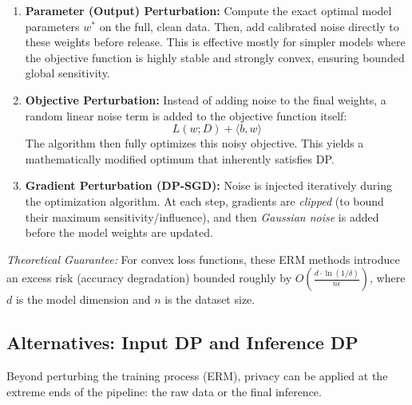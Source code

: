 \documentclass[11pt, a4paper]{article}
\begin{document}
\begin{enumerate}
    \item \textbf{Parameter (Output) Perturbation:}
    Compute the exact optimal model parameters $w^*$ on the full, clean data. Then, add calibrated noise directly to these weights before release. This is effective mostly for simpler models where the objective function is highly stable and strongly convex, ensuring bounded global sensitivity.
    
    \item \textbf{Objective Perturbation:}
    Instead of adding noise to the final weights, a random linear noise term is added to the objective function itself: 
    \[ L(w;D) + \langle b, w \rangle \]
    The algorithm then fully optimizes this noisy objective. This yields a mathematically modified optimum that inherently satisfies DP.
    
    \item \textbf{Gradient Perturbation (DP-SGD):}
    Noise is injected iteratively during the optimization algorithm. At each step, gradients are \textit{clipped} (to bound their maximum sensitivity/influence), and then \textit{Gaussian noise} is added before the model weights are updated.
\end{enumerate}

\textit{Theoretical Guarantee:} For convex loss functions, these ERM methods introduce an excess risk (accuracy degradation) bounded roughly by $O\left(\frac{d \cdot \ln(1/\delta)}{n \epsilon}\right)$, where $d$ is the model dimension and $n$ is the dataset size.

\subsection{Alternatives: Input DP and Inference DP}
Beyond perturbing the training process (ERM), privacy can be applied at the extreme ends of the pipeline: the raw data or the final inference.
\end{document}
